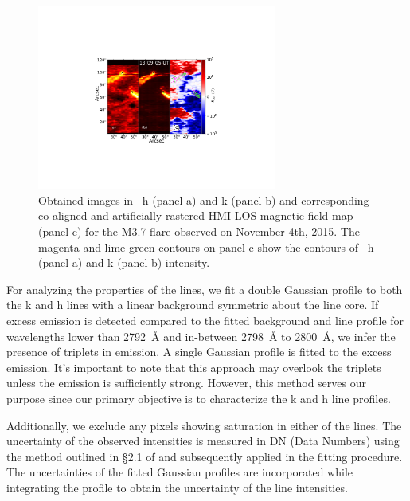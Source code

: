 \begin{figure}[ht!]
\centering  
\vspace{10cm}
\includegraphics[trim={7cm 5cm 6cm 15cm},width=0.7\textwidth]{Figures/m_flare_iris.pdf}
\caption[~h and k line intensity observation with artificially rastered HMI LOS magnetic field for the November 4th, 2015 flare.]{Obtained images in ~h (panel a) and k (panel b) and corresponding co-aligned and artificially rastered HMI LOS magnetic field map (panel c) for the M3.7 flare observed on November 4th, 2015. The magenta and lime green contours on panel c show the contours of  ~h (panel a) and k (panel b) intensity.} \label{fig:aligned_raster}
\end{figure}

For analyzing the properties of the   lines, we fit a double Gaussian profile to both the k and h lines with a linear background symmetric about the line core. If excess emission is detected compared to the fitted background and line profile for wavelengths lower than 2792~{\AA} and in-between 2798~{\AA} to 2800~{\AA}, we infer the presence of   triplets in emission. A single Gaussian profile is fitted to the excess emission. It's important to note that this approach may overlook the triplets unless the emission is sufficiently strong. However, this method serves our purpose since our primary objective is to characterize the   k and h line profiles.

Additionally, we exclude any pixels showing saturation in either of the lines. The uncertainty of the observed intensities is measured in DN (Data Numbers) using the method outlined in \S2.1 of \cite{kerr15} and subsequently applied in the fitting procedure. The uncertainties of the fitted Gaussian profiles are incorporated while integrating the profile to obtain the uncertainty of the line intensities.

